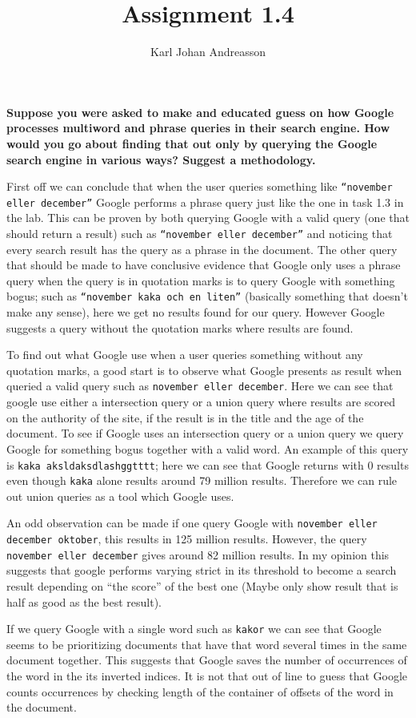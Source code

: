 \documentclass[10pt,a4paper]{article}
\author{Karl Johan Andreasson}
\title{Assignment 1.4}
\begin{document}
\maketitle
\textbf{Suppose	you	were	 asked to make and educated guess on how Google processes multiword and phrase queries in their search engine. How would you go about finding that out only by querying the Google search engine in various ways? Suggest a methodology.}

First off we can conclude that when the user queries something like \texttt{``november eller december''} Google performs a phrase query just like the one in task 1.3 in the lab. This can be proven by both querying Google with a valid query (one that should return a result) such as \texttt{``november eller december''} and noticing that every search result has the query as a phrase in the document. The other query that should be made to have conclusive evidence that Google only uses a phrase query when the query is in quotation marks is to query Google with something bogus; such as \texttt{``november kaka och en liten''} (basically something that doesn't make any sense), here we get no results found for our query. However Google suggests a query without the quotation marks where results are found.


To find out what Google use when a user queries something without any quotation marks, a good start is to observe what Google presents as result when queried a valid query such as \texttt{november eller december}. Here we can see that google use either a intersection query or a union query where results are scored on the authority of the site, if the result is in the title and the age of the document. To see if Google uses an intersection query or a union query we query Google for something bogus together with a valid word. An example of this query is \texttt{kaka aksldaksdlashggtttt}; here we can see that Google returns with 0 results even though \texttt{kaka} alone results around 79 million results. Therefore we can rule out union queries as a tool which Google uses.

An odd observation can be made if one query Google with \texttt{november eller december oktober}, this results in 125 million results. However, the query \texttt{november eller december} gives around 82 million results. In my opinion this suggests that google performs varying strict in its threshold to become a search result depending on ``the score'' of the best one (Maybe only show result that is half as good as the best result).

If we query Google with a single word such as \texttt{kakor} we can see that Google seems to be prioritizing documents that have that word several times in the same document together. This suggests that Google saves the number of occurrences of the word in the its inverted indices. It is not that out of line to guess that Google counts occurrences by checking length of the container of offsets of the word in the document. 
\end{document}
